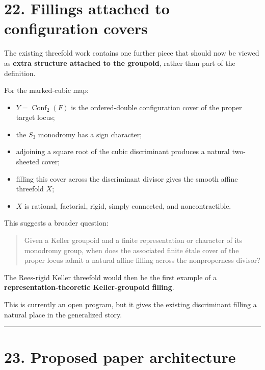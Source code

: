 \section{22. Fillings attached to configuration
covers}\label{fillings-attached-to-configuration-covers}

The existing threefold work contains one further piece that should now
be viewed as \textbf{extra structure attached to the groupoid}, rather
than part of the definition.

For the marked-cubic map:

\begin{itemize}
\tightlist
\item
  \(Y=\operatorname{Conf}_2(F)\) is the ordered-double configuration
  cover of the proper target locus;
\item
  the \(S_3\) monodromy has a sign character;
\item
  adjoining a square root of the cubic discriminant produces a natural
  two-sheeted cover;
\item
  filling this cover across the discriminant divisor gives the smooth
  affine threefold \(X\);
\item
  \(X\) is rational, factorial, rigid, simply connected, and
  noncontractible.
\end{itemize}

This suggests a broader question:

\begin{quote}
Given a Keller groupoid and a finite representation or character of its
monodromy group, when does the associated finite étale cover of the
proper locus admit a natural affine filling across the nonproperness
divisor?
\end{quote}

The Rees-rigid Keller threefold would then be the first example of a
\textbf{representation-theoretic Keller-groupoid filling}.

This is currently an open program, but it gives the existing
discriminant filling a natural place in the generalized story.

\begin{center}\rule{0.5\linewidth}{0.5pt}\end{center}

\section{23. Proposed paper
architecture}\label{proposed-paper-architecture}

